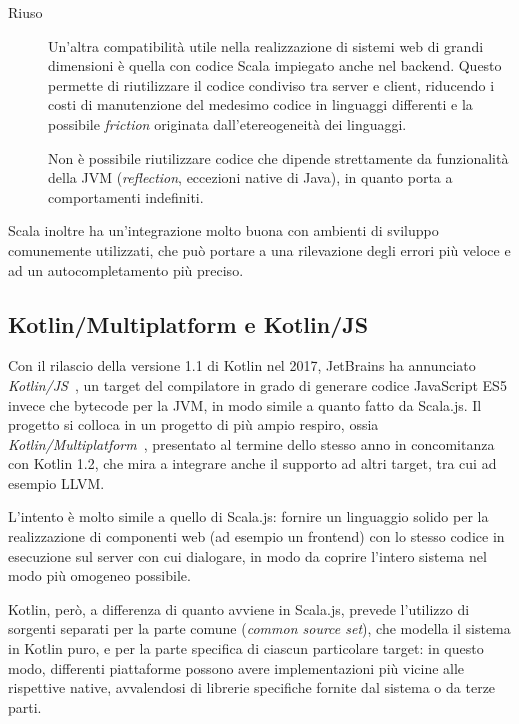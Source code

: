 \begin{description}
        \item[Riuso]
          Un'altra compatibilità utile nella realizzazione di sistemi web di grandi dimensioni è quella con codice Scala impiegato anche nel backend.
          Questo permette di riutilizzare il codice condiviso tra server e client,
          riducendo i costi di manutenzione del medesimo codice in linguaggi differenti e la possibile \emph{friction} originata dall'etereogeneità dei linguaggi.

          Non è possibile riutilizzare codice che dipende strettamente da funzionalità della JVM (\emph{reflection}, eccezioni native di Java), in quanto porta a comportamenti indefiniti.
      \end{description}

      Scala inoltre ha un'integrazione molto buona con ambienti di sviluppo comunemente utilizzati, che può portare a una rilevazione degli errori più veloce e ad un autocompletamento più preciso.

    \subsection{Kotlin/Multiplatform e Kotlin/JS}\label{subsec:kotlinjs}
      Con il rilascio della versione 1.1 di Kotlin nel 2017, JetBrains ha annunciato \emph{Kotlin/JS}~\cite{Belov2017}, un target del compilatore in grado di generare codice JavaScript ES5 invece che bytecode per la JVM, in modo simile a quanto fatto da Scala.js.
      Il progetto si colloca in un progetto di più ampio respiro, ossia \emph{Kotlin/Multiplatform}~\cite{Jemerov2017}, presentato al termine dello stesso anno in concomitanza con Kotlin 1.2, che mira a integrare anche il supporto ad altri target, tra cui ad esempio LLVM\@.

      L'intento è molto simile a quello di Scala.js:
      fornire un linguaggio solido per la realizzazione di componenti web (ad esempio un frontend) con lo stesso codice in esecuzione sul server con cui dialogare, in modo da coprire l'intero sistema nel modo più omogeneo possibile.

      Kotlin, però, a differenza di quanto avviene in Scala.js, prevede l'utilizzo di sorgenti separati per la parte comune (\emph{common source set}), che modella il sistema in Kotlin puro, e per la parte specifica di ciascun particolare target:
      in questo modo, differenti piattaforme possono avere implementazioni più vicine alle rispettive native, avvalendosi di librerie specifiche fornite dal sistema o da terze parti.

